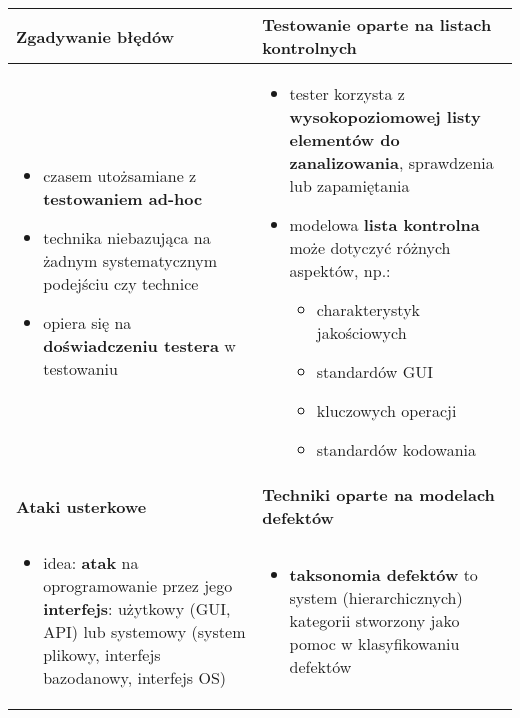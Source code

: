 \documentclass[../main.tex]{subfiles}
\begin{document}
    \begin{table}[H]
        \begin{center}
            \begin{tabular}{| p{8cm} | p{8cm} |}
                \hline
                \textbf{Zgadywanie błędów} & \textbf{Testowanie oparte na listach kontrolnych}\\
                \hline
                \begin{itemize}
                    \item czasem utożsamiane z \textbf{testowaniem ad-hoc}
                    \item technika niebazująca na żadnym systematycznym podejściu czy technice
                    \item opiera się na \textbf{doświadczeniu testera} w testowaniu
                \end{itemize}
                &
                \begin{itemize}
                    \item tester korzysta z \textbf{wysokopoziomowej listy elementów do
                    zanalizowania}, sprawdzenia lub zapamiętania
                    \item modelowa \textbf{lista kontrolna} może dotyczyć różnych aspektów, np.:
                    \begin{itemize}
                        \item charakterystyk jakościowych
                        \item standardów GUI
                        \item kluczowych operacji
                        \item standardów kodowania
                    \end{itemize}
                \end{itemize}\\
                \hline
                \hline
                \textbf{Ataki usterkowe} & \textbf{Techniki oparte na modelach defektów}\\
                \hline
                \begin{itemize}
                    \item idea: \textbf{atak} na oprogramowanie przez jego \textbf{interfejs}: użytkowy (GUI, API)
                    lub systemowy (system plikowy, interfejs bazodanowy, interfejs OS)
                \end{itemize}
                &
                \begin{itemize}
                    \item \textbf{taksonomia defektów} to system (hierarchicznych) kategorii
                    stworzony jako pomoc w klasyfikowaniu defektów
                \end{itemize}\\
                \hline
            \end{tabular}
        \end{center}
    \end{table}
\end{document}
